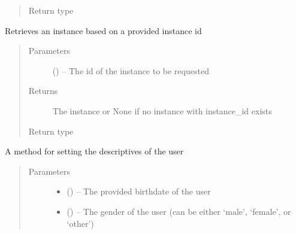 \documentclass[letterpaper,10pt,english]{sphinxmanual}
\begin{document}
\begin{fulllineitems}
\begin{fulllineitems}
\begin{quote}
\begin{description}
\item[{Return type}] \leavevmode
{\hyperref[\detokenize{instance:instance.Instance}]{}}

\end{description}\end{quote}

\end{fulllineitems}


\begin{fulllineitems}
\label{\detokenize{user:user.User.get_instance_by_id}}
Retrieves an instance based on a provided instance id
\begin{quote}\begin{description}
\item[{Parameters}] \leavevmode
{} () -- The id of the instance to be requested

\item[{Returns}] \leavevmode
The instance or None if no instance with instance\_id exists

\item[{Return type}] \leavevmode
{\hyperref[\detokenize{instance:instance.Instance}]{}}

\end{description}\end{quote}

\end{fulllineitems}


\begin{fulllineitems}
\label{\detokenize{user:user.User.set_descriptives}}
A method for setting the descriptives of the user
\begin{quote}\begin{description}
\item[{Parameters}] \leavevmode\begin{itemize}
\item {} 
 () -- The provided birthdate of the user

\item {} 
 (\href{https://docs.python.org/2/library/string.html\#module-string}{}) -- The gender of the user (can be either `male', `female', or `other')


\end{itemize}
\end{description}
\end{quote}
\end{fulllineitems}
\end{fulllineitems}
\end{document}
